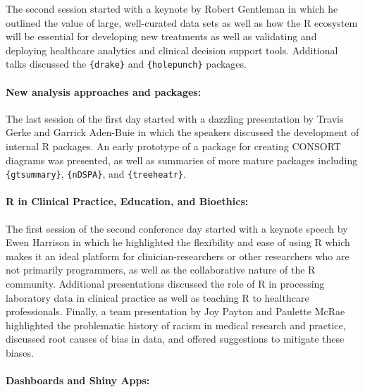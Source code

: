 The second session started with a keynote by Robert Gentleman in which
he outlined the value of large, well-curated data sets as well as how
the R ecosystem will be essential for developing new treatments as well
as validating and deploying healthcare analytics and clinical decision
support tools. Additional talks discussed the \texttt{\{drake\}} and
\texttt{\{holepunch\}} packages.

\hypertarget{new-analysis-approaches-and-packages}{%
\paragraph{New analysis approaches and
packages:}\label{new-analysis-approaches-and-packages}}

The last session of the first day started with a dazzling presentation
by Travis Gerke and Garrick Aden-Buie in which the speakers discussed
the development of internal R packages. An early prototype of a package
for creating CONSORT diagrams was presented, as well as summaries of
more mature packages including \texttt{\{gtsummary\}},
\texttt{\{nDSPA\}}, and \texttt{\{treeheatr\}}.

\hypertarget{r-in-clinical-practice-education-and-bioethics}{%
\paragraph{R in Clinical Practice, Education, and
Bioethics:}\label{r-in-clinical-practice-education-and-bioethics}}

The first session of the second conference day started with a keynote
speech by Ewen Harrison in which he highlighted the flexibility and ease
of using R which makes it an ideal platform for clinician-researchers or
other researchers who are not primarily programmers, as well as the
collaborative nature of the R community. Additional presentations
discussed the role of R in processing laboratory data in clinical
practice as well as teaching R to healthcare professionals. Finally, a
team presentation by Joy Payton and Paulette McRae highlighted the
problematic history of racism in medical research and practice,
discussed root causes of bias in data, and offered suggestions to
mitigate these biases.

\hypertarget{dashboards-and-shiny-apps}{%
\paragraph{Dashboards and Shiny Apps:}\label{dashboards-and-shiny-apps}}


